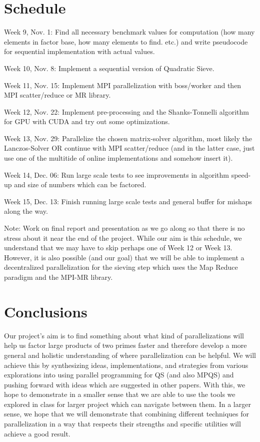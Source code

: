 \documentclass[11pt,twocolumn]{article}
\newenvironment{my_enumerate}{
  \begin{enumerate}
    \setlength{\itemsep}{1pt}
      \setlength{\parskip}{0pt}
\setlength{\parsep}{0pt}}{\end{enumerate}
}
\begin{document}
\section {Schedule}\label{sched}
\begin{my_enumerate}
  \item Week 9, Nov. 1: Find all necessary benchmark values for computation (how many elements in factor base, how many elements to find. etc.) and write pseudocode for sequential implementation with actual values.
  \item Week 10, Nov. 8: Implement a sequential version of Quadratic Sieve.
  \item Week 11, Nov. 15: Implement MPI parallelization with boss/worker and then MPI scatter/reduce or MR library.
  \item Week 12, Nov. 22: Implement pre-processing and the Shanks-Tonnelli algorithm for GPU with CUDA and try out some optimizations.
  \item Week 13, Nov. 29: Parallelize the chosen matrix-solver algorithm, most likely the Lanczos-Solver OR continue with MPI scatter/reduce (and in the latter case, just use one of the multitide of online implementations and somehow insert it).
  \item Week 14, Dec. 06: Run large scale tests to see improvements in algorithm speed-up and size of numbers which can be factored.
  \item Week 15, Dec. 13: Finish running large scale tests and general buffer for mishaps along the way.
\end{my_enumerate}

Note: Work on final report and presentation as we go along so that there is no stress about it near the end of the project. While our aim is this schedule, we understand that we may have to skip perhaps one of Week 12 or Week 13. However, it is also possible (and our goal) that we will be able to implement a decentralized parallelization for the sieving step which uses the Map Reduce paradigm and the MPI-MR library.

\section{Conclusions} \label{conc} Our project's aim is to find something about what kind of parallelizations will help us factor large products of two primes faster and therefore develop a more general and holistic understanding of where parallelization can be helpful. We will achieve this by synthesizing ideas, implementations, and strategies from various explorations into using parallel programming for QS (and also MPQS) and pushing forward with ideas which are suggested in other papers. With this, we hope to demonstrate in a smaller sense that we are able to use the tools we explored in class for larger project which can navigate between them. In a larger sense, we hope that we will demonstrate that combining different techniques for parallelization in a way that respects their strengths and specific utilities will achieve a good result.
\end{document}
